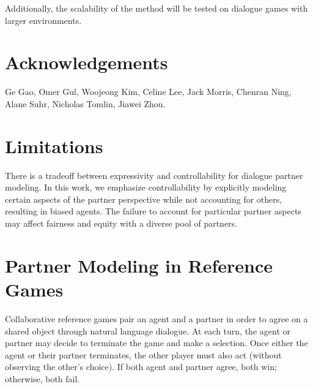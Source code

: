 \documentclass[11pt]{article}
\begin{document}
Additionally, the scalability of the method will be tested on dialogue games with larger environments.


\section*{Acknowledgements}
Ge Gao, Omer Gul, Woojeong Kim, Celine Lee, Jack Morris, Chenran Ning, Alane Suhr, Nicholas Tomlin, Jiawei Zhou.

\section*{Limitations}
There is a tradeoff between expressivity and  controllability for dialogue partner modeling.
In this work, we emphasize controllability by explicitly modeling certain aspects of the partner perspective while not accounting for others, resulting in biased agents.
The failure to account for
particular partner aspects may affect fairness and equity with a diverse pool of partners.





\appendix



\section{Partner Modeling in Reference Games}
\label{sec:planning}

Collaborative reference games pair an agent and a partner in order to agree on a shared object through natural language dialogue.
At each turn, the agent or partner may decide to terminate the game and make a selection.
Once either the agent or their partner terminates, the other player must also act (without observing the other's choice). If both agent and partner agree, both win; otherwise, both fail. 
\end{document}
